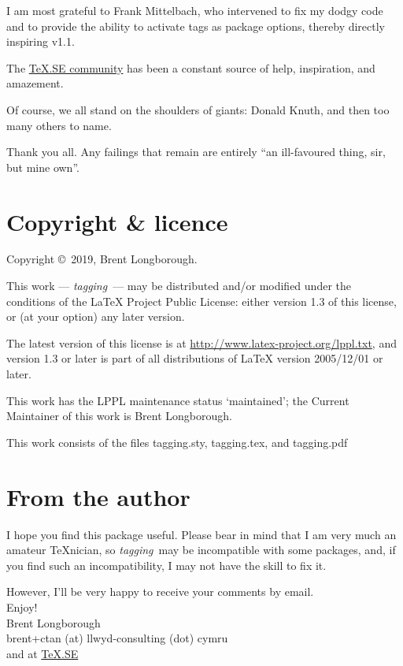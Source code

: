 \documentclass[a4paper,12pt,twoside,openany]{memoir}
\newcommand{\tpn}{tagging}
\newcommand{\tpname}{\textsf{\itshape \tpn}}
\begin{document}
I am most grateful to Frank Mittelbach, who intervened to fix my
dodgy code and to provide the ability to activate tags as
package options, thereby directly inspiring v1.1.

The \href{http://tex.stackexchange.com}{\TeX.SE community} has
been a constant source of help, inspiration, and amazement.

Of course, we all stand on the shoulders of giants: Donald
Knuth, and then too many others to name.

Thank you all. Any failings that remain are entirely
``an ill-favoured thing, sir, but mine own''.

\clearpage
\section{Copyright \& licence}
Copyright \copyright\ 2019, Brent Longborough.

This work --- \tpname\ --- may be distributed and/or modified under the
conditions of the LaTeX Project Public License: either version 1.3
of this license, or (at your option) any later version.

The latest version of this license is at
\url{http://www.latex-project.org/lppl.txt},
and version 1.3 or later is part of all distributions of \LaTeX
version 2005/12/01 or later.

This work has the LPPL maintenance status `maintained';
the Current Maintainer of this work is Brent Longborough.

This work consists of the files 
tagging.sty, tagging.tex, and tagging.pdf

\section{From the author}
I hope you find this package useful.
Please bear in mind that I am very much an amateur \TeX nician,
so \tpname\ may be incompatible with some packages, and,
if you find such an incompatibility, I may not have the skill to fix it.

However, I'll be very happy to receive your comments by email.\\[\baselineskip]
Enjoy!\\
Brent Longborough\\[\baselineskip]
\textsf{brent+ctan (at) llwyd-consulting (dot) cymru}\\
and at \href{http://tex.stackexchange.com/users/344/brent-longborough}{\TeX.SE}
\end{document}
